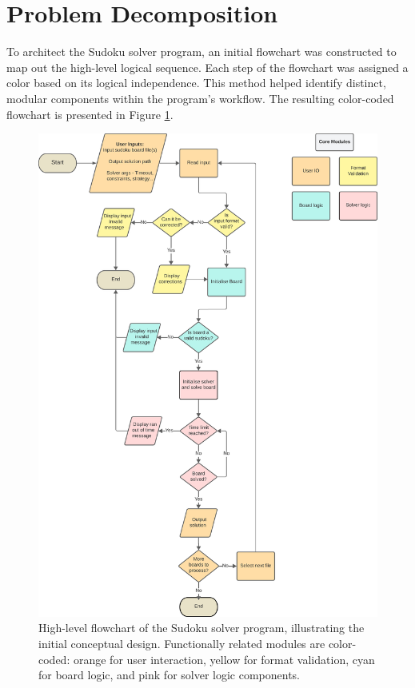 \documentclass[11pt]{article}
\begin{document}
\section{Problem Decomposition}
To architect the Sudoku solver program, an initial flowchart was constructed to map out the high-level logical sequence. Each step of the flowchart was assigned a color based on its logical independence. This method helped identify distinct, modular components within the program's workflow. The resulting color-coded flowchart is presented in Figure \ref{fig:solver_flowchart}.
\begin{figure}[H]
\centering
\includegraphics[width=1\textwidth]{figs/solver_flowchart.png}
\caption{High-level flowchart of the Sudoku solver program, illustrating the initial conceptual design. Functionally related modules are color-coded: orange for user interaction, yellow for format validation, cyan for board logic, and pink for solver logic components.}
\label{fig:solver_flowchart}
\end{figure}
\end{document}
